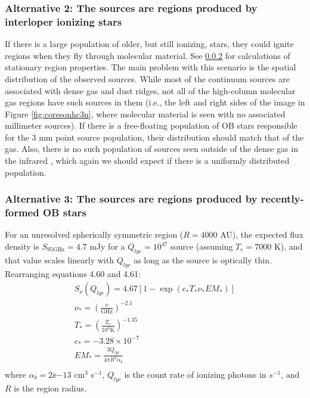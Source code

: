\documentclass{emulateapj}
\begin{document}
\subsubsection{Alternative 2: The sources are \hii regions produced by interloper ionizing stars}
If there is a large population of older, but still ionizing, stars, they could
ignite \hii regions when they fly through molecular material.  See
\ref{sec:theyarehiiregions} for calculations of stationary \hii region
properties.  The main problem with this scenario is the spatial distribution of
the observed sources.  While most of the continuum sources are associated with
dense gas and dust ridges, not all of the high-column molecular gas regions
have such sources in them (i.e., the left and right sides of the image in
Figure \ref{fig:coresonhc3n}, where molecular material is seen with no
associated millimeter sources).  If there is a free-floating population of OB
stars responsible for the 3 mm point source population, their distribution
should match that of the gas.  Also, there is no such population of sources
seen outside of the dense gas in the infrared \citep[TODO: Who has done
infrared studies of Sgr B2?  You can infer what I have stated `by inspection'
of 2MASS, but it would be more straightforward to quote someone else][]{},
which again we should
expect if there is a uniformly distributed population.  

\subsubsection{Alternative 3: The sources are \hii regions produced by recently-formed OB stars}
\label{sec:theyarehiiregions}

For an unresolved spherically symmetric \hii region ($R=4000$ AU), the expected
flux density is $S_{95 \mathrm{GHz}} = 4.7$ mJy for a $Q_{lyc}=10^{47}$ \pers
source (assuming $T_e=7000$ K), and that value scales linearly with $Q_{lyc}$
as long as the source is optically thin.  Rearranging \citet{Condon2007a} equations
4.60 and 4.61:
\begin{eqnarray}
S_{\nu}(Q_{lyc})  = 4.67 \left[1-\exp\left(c_* T_* \nu_* EM_* \right) \right] \nonumber \\
\nu_* = \left(\frac{\nu}{\mathrm{GHz}}\right)^{-2.1} \nonumber \\
T_* = \left(\frac{T_e}{10^4 \mathrm{K}}\right)^{-1.35} \nonumber \\
c_* = -3.28\times10^{-7} \nonumber \\
EM_* = \frac{3 Q_{lyc}}{4 \pi R^2 \alpha_b} \nonumber \\
\end{eqnarray}
where $\alpha_b=2\ee{-13}$ cm$^3$ s$^{-1}$, $Q_{lyc}$ is the count rate
of ionizing photons in $s^{-1}$, and $R$ is the \hii region radius.
\end{document}
